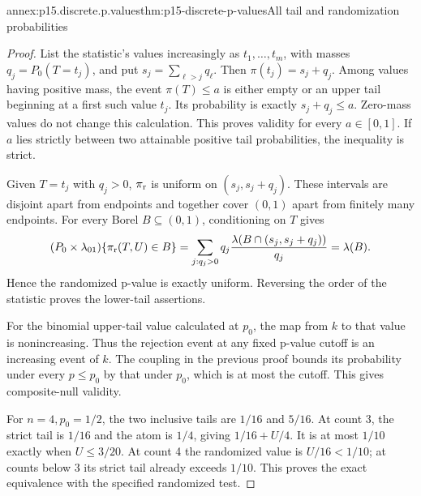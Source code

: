 \begin{annexitem}{annex:p15.discrete.p.values}{thm:p15-discrete-p-values}{All tail and randomization probabilities}
\begin{proof}
List the statistic's values increasingly
as \(t_1,\ldots,t_m\), with masses
\(q_j=P_0(T=t_j)\), and put
\(s_j=\sum_{\ell>j}q_\ell\).
Then \(\pi(t_j)=s_j+q_j\).
Among values having positive mass,
the event \(\pi(T)\leq a\) is
either empty or an upper tail
beginning at a first such value
\(t_j\). Its probability is
exactly \(s_j+q_j\leq a\).
Zero-mass values do not change
this calculation. This proves
validity for every \(a\in[0,1]\).
If \(a\) lies strictly between
two attainable positive tail
probabilities, the inequality
is strict.

Given \(T=t_j\) with \(q_j>0\),
\(\pi_{\rm r}\) is uniform on
\((s_j,s_j+q_j)\).
These intervals are disjoint
apart from endpoints and together
cover \((0,1)\) apart from finitely
many endpoints. For every Borel
\(B\subseteq(0,1)\), conditioning
on \(T\) gives
\[
 (P_0\times\lambda_{01})\{\pi_{\rm r}(T,U)\in B\}
  =\sum_{j:q_j>0}q_j
           \frac{\lambda(B\cap(s_j,s_j+q_j))}{q_j}
  =\lambda(B).
\]
Hence the randomized p-value
is exactly uniform. Reversing
the order of the statistic
proves the lower-tail assertions.

For the binomial upper-tail value
calculated at \(p_0\), the map
from \(k\) to that value is
nonincreasing. Thus the rejection
event at any fixed p-value cutoff
is an increasing event of \(k\).
The coupling in the previous proof
bounds its probability under
every \(p\leq p_0\) by that
under \(p_0\), which is at
most the cutoff. This gives
composite-null validity.

For \(n=4,p_0=1/2\), the two
inclusive tails are \(1/16\)
and \(5/16\). At count 3,
the strict tail is \(1/16\)
and the atom is \(1/4\),
giving \(1/16+U/4\).
It is at most \(1/10\)
exactly when \(U\leq3/20\).
At count 4 the randomized
value is \(U/16<1/10\);
at counts below 3 its
strict tail already exceeds
\(1/10\). This proves the
exact equivalence with the
specified randomized test.
\end{proof}
\end{annexitem}

